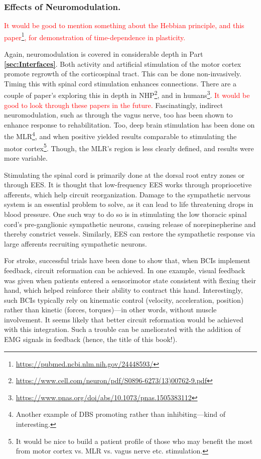\subsubsection{Effects of Neuromodulation.}

\textcolor{red}{It would be good to mention something about the Hebbian principle, and this paper\footnote{\url{https://pubmed.ncbi.nlm.nih.gov/24448593/}}, for demonstration of time-dependence in plasticity.}\newline

Again, neuromodulation is covered in considerable depth in Part \textbf{\ref{sec:Interfaces}}. Both activity and artificial stimulation of the motor cortex promote regrowth of the corticospinal tract. This can be done non-invasively. Timing this with spinal cord stimulation enhances connections. There are a couple of paper's exploring this in depth in NHP\footnote{\url{https://www.cell.com/neuron/pdf/S0896-6273(13)00762-9.pdf}}, and in humans\footnote{\url{https://www.pnas.org/doi/abs/10.1073/pnas.1505383112}}. \textcolor{red}{It would be good to look through these papers in the future.} Fascinatingly, indirect neuromodulation, such as through the vagus nerve, too has been shown to enhance response to rehabilitation. Too, deep brain stimulation has been done on the MLR\footnote{Another example of DBS promoting rather than inhibiting---kind of interesting.}, and when positive yielded results comparable to stimulating the motor cortex\footnote{It would be nice to build a patient profile of those who may benefit the most from motor cortex vs. MLR vs. vagus nerve etc. stimulation.}. Though, the MLR's region is less clearly defined, and results were more variable.\newline

Stimulating the spinal cord is primarily done at the dorsal root entry zones or through EES. It is thought that low-frequency EES works through propriocetive afferents, which help circuit reorganization. Damage to the sympathetic nervous system is an essential problem to solve, as it can lead to life threatening drops in blood pressure. One such way to do so is in stimulating the low thoracic spinal cord's pre-ganglionic sympathetic neurons, causing release of norepinepherine and thereby constrict vessels. Similarly, EES can restore the sympathetic response via large afferents recruiting sympathetic neurons.\newline

For stroke, successful trials have been done to show that, when BCIs implement feedback, circuit reformation can be achieved. In one example, visual feedback was given when patients entered a sensorimotor state consistent with flexing their hand, which helped reinforce their ability to contract this hand. Interestingly, such BCIs typically rely on kinematic control (velocity, acceleration, position) rather than kinetic (forces, torques)---in other words, without muscle involvement. It seems likely that better circuit reformation would be achieved with this integration. Such a trouble can be ameliorated with the addition of EMG signals in feedback (hence, the title of this book!). 

